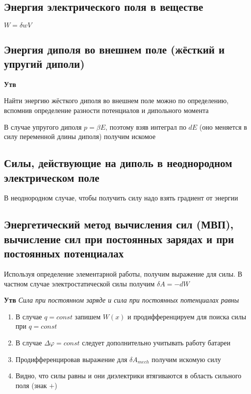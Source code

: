 \documentclass[a4paper, 14pt]{article}
\begin{document}
    \subsection{Энергия электрического поля в веществе}
    
    $W = \delta w V$
    
    \subsection{Энергия диполя во внешнем поле (жёсткий и упругий диполи)}
    
    \textbf{Утв} \textit{}
    
    Найти энергию жёсткого диполя во внешнем поле можно по определению, вспомнив определение разности потенциалов и
    дипольного момента
    
    В случае упругого диполя $p = \beta E$, поэтому взяв интеграл по $dE$ (оно меняется в силу переменной длины
    диполя) получим искомое
    
    \subsection{Силы, действующие на диполь в неоднородном электрическом поле}
    
    В неоднородном случае, чтобы получить силу надо взять градиент от энергии
    
    \subsection{Энергетический метод вычисления сил (МВП), вычисление сил при постоянных зарядах и при постоянных
    потенциалах}
    
    Используя определение элементарной работы, получим выражение для силы.
    В частном случае электростатической силы получим $\delta A = - dW$
    
    \textbf{Утв} \textit{Сила при постоянном заряде и сила при постоянных потенциалах равны}
    
    \begin{enumerate}
        \item В случае $q = const$ запишем $W(x)$ и продифференцируем для поиска силы при $q = const$
        \item В случае $\Delta \varphi = const$ следует дополнительно учитывать работу батареи
        \item Продифференцировав выражение для $\delta A_{mech}$ получим искомую силу
        \item Видно, что силы равны и они диэлектрики втягиваются в область сильного поля (знак $+$)
    \end{enumerate}
    
\end{document}
